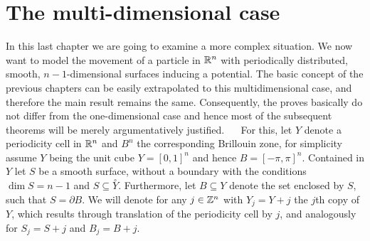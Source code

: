 \chapter{The multi-dimensional case} \label{chap5}

In this last chapter we are going to examine a more complex situation. We now want to model the movement of a particle in $\mathbb{R}^{n}$ with periodically distributed, smooth, $n-1$-dimensional surfaces inducing a potential. The basic concept of the previous chapters can be easily extrapolated to this multidimensional case, and therefore the main result remains the same. Consequently, the proves basically do not differ from the one-dimensional case and hence most of the subsequent theorems will be merely argumentatively justified.
~\newline ~\newline
For this, let $Y$ denote a periodicity cell in $\mathbb{R}^{n}$ and $B^{n}$ the corresponding Brillouin zone, for simplicity assume $Y$ being the unit cube $Y = [0, 1]^{n}$ and hence $B = [-\pi, \pi]^{n}$. Contained in $Y$ let $S$ be a smooth surface, without a boundary with the conditions $\dim S = n - 1$ and $S \subseteq \overset{\circ}{Y}$. Furthermore, let $B \subseteq Y$ denote the set enclosed by $S$, such that $S = \partial B$. We will denote for any $j \in \mathbb{Z}^{n}$ with $Y_{j} = Y + j$ the $j$th copy of $Y$, which results through translation of the periodicity cell by $j$, and analogously for $S_{j} = S + j$ and $B_{j} = B + j$. %

